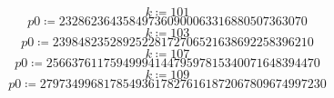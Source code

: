 \documentclass[11pt,a4paper,fleqn]{article}
\begin{document}
\begin{enumerate}[1.]
\begin{enumerate}[(a)]
\begin{flushleft}
\begin{mdframed}
\begin{dmath*}
                        k \coloneqq 101
                    \end{dmath*}
                    \vspace{-\bigskipamount}
                    \begin{dmath*}
                        \mathit{p0} \coloneqq 232862364358497360900063316880507363070
                    \end{dmath*}
                    \vspace{-\bigskipamount}
                    \begin{dmath*}
                        k \coloneqq 103
                    \end{dmath*}
                    \vspace{-\bigskipamount}
                    \begin{dmath*}
                        \mathit{p0} \coloneqq 23984823528925228172706521638692258396210
                    \end{dmath*}
                    \vspace{-\bigskipamount}
                    \begin{dmath*}
                        k \coloneqq 107
                    \end{dmath*}
                    \vspace{-\bigskipamount}
                    \begin{dmath*}
                        \mathit{p0} \coloneqq 2566376117594999414479597815340071648394470
                    \end{dmath*}
                    \vspace{-\bigskipamount}
                    \begin{dmath*}
                        k \coloneqq 109
                    \end{dmath*}
                    \vspace{-\bigskipamount}
                    \begin{dmath*}
                        \mathit{p0} \coloneqq 279734996817854936178276161872067809674997230
                    \end{dmath*}
                    \vspace{-\bigskipamount}
                    \begin{dmath*}

\end{dmath*}
\end{mdframed}
\end{flushleft}
\end{enumerate}
\end{enumerate}
\end{document}
